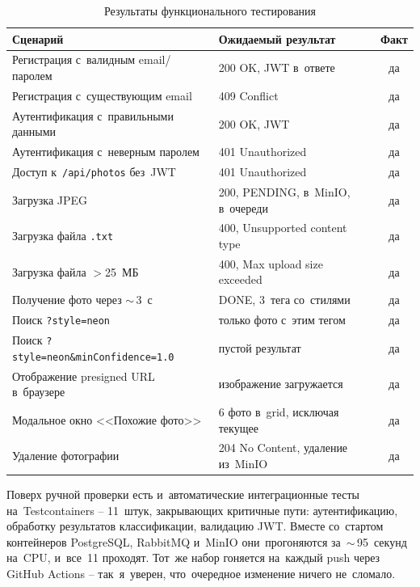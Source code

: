 \documentclass[a4paper,12pt]{diplom}
\begin{document}
\begin{table}[!ht]
\caption{Результаты функционального тестирования}
\label{tab:functional}
\centering
\begin{tabular}{p{7.5cm}p{4.5cm}c}
\toprule
\textbf{Сценарий} & \textbf{Ожидаемый результат} & \textbf{Факт} \\
\midrule
Регистрация с~валидным email/паролем     & 200 OK, JWT в~ответе       & да \\
Регистрация с~существующим email         & 409 Conflict               & да \\
Аутентификация с~правильными данными     & 200 OK, JWT                & да \\
Аутентификация с~неверным паролем        & 401 Unauthorized           & да \\
Доступ к~\texttt{/api/photos} без~JWT    & 401 Unauthorized           & да \\
Загрузка JPEG                            & 200, PENDING, в~MinIO, в~очереди & да \\
Загрузка файла \texttt{.txt}             & 400, Unsupported content type   & да \\
Загрузка файла $>$25~МБ                  & 400, Max upload size exceeded  & да \\
Получение фото через $\sim$\,3~с         & DONE, 3~тега со~стилями    & да \\
Поиск \texttt{?style=neon}               & только фото с~этим тегом   & да \\
Поиск \texttt{?style=neon\&minConfidence=1.0} & пустой результат      & да \\
Отображение presigned URL в~браузере     & изображение загружается    & да \\
Модальное окно <<Похожие фото>>          & 6 фото в~grid, исключая текущее & да \\
Удаление фотографии                      & 204 No Content, удаление из~MinIO & да \\
\bottomrule
\end{tabular}
\end{table}

Поверх ручной проверки есть и~автоматические интеграционные тесты на~Testcontainers -- 11~штук, закрывающих критичные пути: аутентификацию, обработку результатов классификации, валидацию JWT. Вместе со~стартом контейнеров PostgreSQL, RabbitMQ и~MinIO они~прогоняются за~$\sim$\,95~секунд на~CPU, и~все~11 проходят. Тот~же набор гоняется на~каждый push через GitHub Actions -- так~я~уверен, что~очередное изменение ничего не~сломало.
\end{document}
